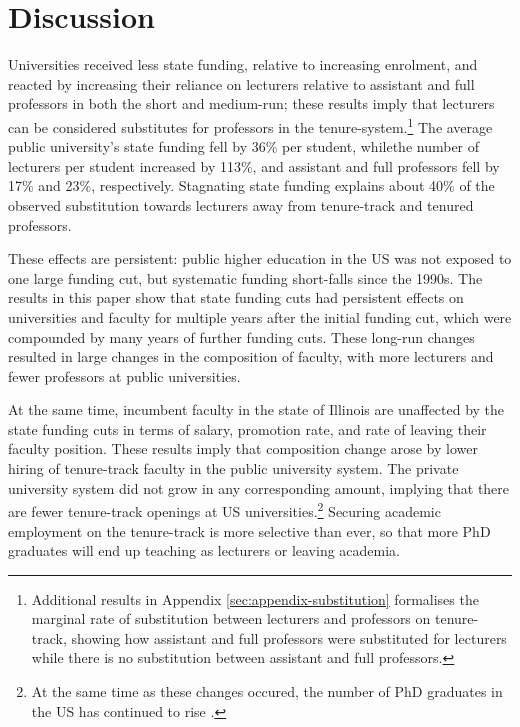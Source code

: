 \section{Discussion}
\label{sec:discussion}

Universities received less state funding, relative to increasing enrolment, and reacted by increasing their reliance on lecturers relative to assistant and full professors in both the short and medium-run; these results imply that lecturers can be considered substitutes for professors in the tenure-system.\footnote{
    Additional results in Appendix \autoref{sec:appendix-substitution} formalises the marginal rate of substitution between lecturers and professors on tenure-track, showing how assistant and full professors were substituted for lecturers while there is no substitution between assistant and full professors.
}
The average public university's state funding fell by 36\% per student, whilethe number of lecturers per student increased by 113\%, and assistant and full professors  fell by 17\% and 23\%, respectively.
Stagnating state funding explains about 40\% of the observed substitution towards lecturers away from tenure-track and tenured professors.

These effects are persistent: public higher education in the US was not exposed to one large funding cut, but systematic funding short-falls since the 1990s.
The results in this paper show that state funding cuts had persistent effects on universities and faculty for multiple years after the initial funding cut, which were compounded by many years of further funding cuts.
These long-run changes resulted in large changes in the composition of faculty, with more lecturers and fewer professors at public universities.

At the same time, incumbent faculty in the state of Illinois are unaffected by the state funding cuts in terms of salary, promotion rate, and rate of leaving their faculty position.
These results imply that composition change arose by lower hiring of tenure-track faculty in the public university system.
The private university system did not grow in any corresponding amount, implying that there are fewer tenure-track openings at US universities.\footnote{
    At the same time as these changes occured, the number of PhD graduates in the US has continued to rise \citep{aau2021survey,wapman2022quantifying}.
}
Securing academic employment on the tenure-track is more selective than ever, so that more PhD graduates will end up teaching as lecturers or leaving academia.

